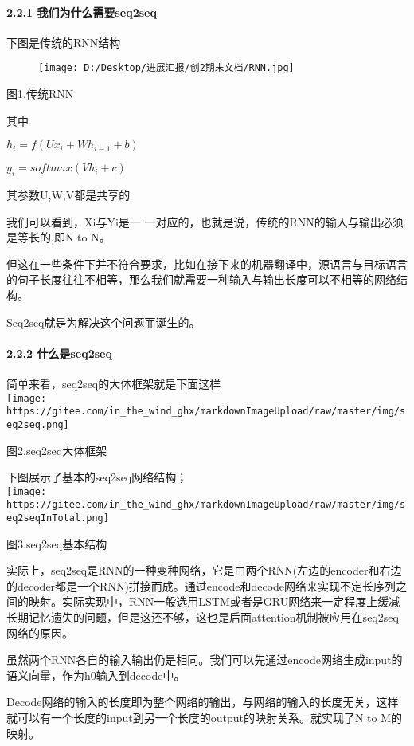 \documentclass[
]{article}
\begin{document}
\hypertarget{header-n18}{%
\paragraph{2.2.1 我们为什么需要seq2seq}\label{header-n18}}

下图是传统的RNN结构

\begin{figure}
\centering
\texttt{[image: D:/Desktop/进展汇报/创2期末文档/RNN.jpg]}
\caption{}
\end{figure}

图1.传统RNN

其中

\( h_i=f(Ux_i+Wh_{i-1}+b) \)

\(y_i=softmax(Vh_i+c)\)

其参数U,W,V都是共享的

我们可以看到，Xi与Yi是一
一对应的，也就是说，传统的RNN的输入与输出必须是等长的,即N to N。

但这在一些条件下并不符合要求，比如在接下来的机器翻译中，源语言与目标语言的句子长度往往不相等，那么我们就需要一种输入与输出长度可以不相等的网络结构。

Seq2seq就是为解决这个问题而诞生的。

\hypertarget{header-n29}{%
\paragraph{2.2.2 什么是seq2seq}\label{header-n29}}

简单来看，seq2seq的大体框架就是下面这样\\
\texttt{[image: https://gitee.com/in\_the\_wind\_ghx/markdownImageUpload/raw/master/img/seq2seq.png]}

图2.seq2seq大体框架

下图展示了基本的seq2seq网络结构；\\
\texttt{[image: https://gitee.com/in\_the\_wind\_ghx/markdownImageUpload/raw/master/img/seq2seqInTotal.png]}

图3.seq2seq基本结构

实际上，seq2seq是RNN的一种变种网络，它是由两个RNN(左边的encoder和右边的decoder都是一个RNN)拼接而成。通过encode和decode网络来实现不定长序列之间的映射。实际实现中，RNN一般选用LSTM或者是GRU网络来一定程度上缓减长期记忆遗失的问题，但是这还不够，这也是后面attention机制被应用在seq2seq网络的原因。

虽然两个RNN各自的输入输出仍是相同。我们可以先通过encode网络生成input的语义向量，作为h0输入到decode中。

Decode网络的输入的长度即为整个网络的输出，与网络的输入的长度无关，这样就可以有一个长度的input到另一个长度的output的映射关系。就实现了N
to M的映射。
\end{document}
